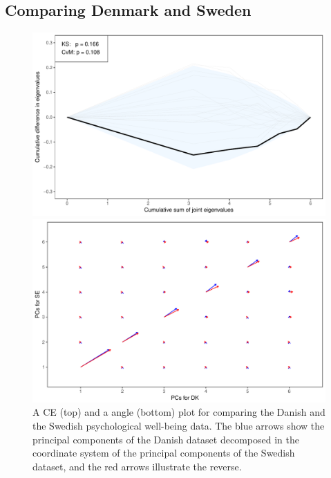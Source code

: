 \documentclass[titlepage,11pt,twoside]{article}
\begin{document}
\subsection{Comparing Denmark and Sweden}
\begin{figure}
\centerline{\includegraphics[scale = 0.65]{essDKSEce.pdf}}
\centerline{\includegraphics[scale = 0.65]{essDKSEhair.pdf}}
\caption{A CE (top) and a angle (bottom) plot for comparing the Danish and the Swedish psychological well-being data. The blue arrows show the principal components of the Danish dataset decomposed in the coordinate system of the principal components of the Swedish dataset, and the red arrows illustrate the reverse.}
\label{plotSE.cehair}
\end{figure}
\end{document}

